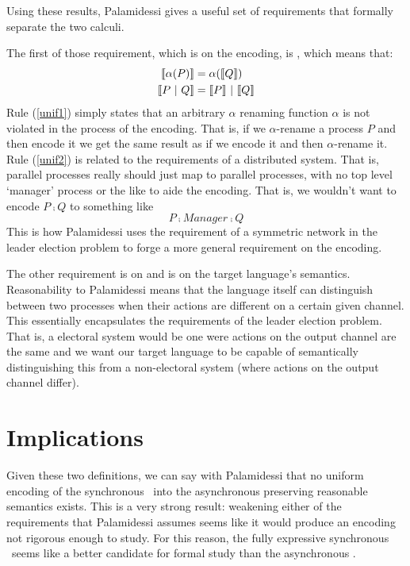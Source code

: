 
Using these results, Palamidessi gives a useful set of requirements that formally separate the two calculi.

The first of those requirement, which is on the encoding, is , which means that:
\begin{align}
	\llbracket{\alpha(P)}\rrbracket &= \alpha(\llbracket{Q}\rrbracket)\label{unif1}\\
	\llbracket{P \ensuremath{\ |\ } Q}\rrbracket &= \llbracket{P}\rrbracket \ |\  \llbracket{Q}\rrbracket\label{unif2}
\end{align}
Rule (\ref{unif1}) simply states that an arbitrary $\alpha$ renaming function $\alpha$  is not violated in the process of the encoding.  That is, if we $\alpha$-rename a process $P$ and then encode it we get the same result as if we encode it and then $\alpha$-rename it.
Rule (\ref{unif2}) is related to the requirements of a distributed system.  
That is, parallel processes really should just map to parallel processes, with no top level `manager' process or the like to aide the encoding.  That is, we wouldn't want to encode $P \comp Q$ to something like 
\[
	P \comp Manager \comp Q
\]
This is how Palamidessi uses the requirement of a symmetric network in the leader election problem to forge a more general requirement on the encoding.

The other requirement is on  and is on the target language's semantics.  
Reasonability to Palamidessi means that the language itself can distinguish between two processes when their actions are different on a certain given channel.  
This essentially encapsulates the requirements of the leader election problem.  
That is, a electoral system would be one were actions on the output channel are the same and we want our target language to be capable of semantically distinguishing this from a non-electoral system (where actions on the output channel differ).

\section{Implications}
Given these two definitions, we can say with Palamidessi that no uniform encoding of the synchronous \picalc\ into the asynchronous \picalc preserving reasonable semantics exists.  This is a very strong result:  weakening either of the requirements that Palamidessi assumes seems like it would produce an encoding not rigorous enough to study.  For this reason, the fully expressive synchronous \picalc\ seems like a better candidate for formal study than the asynchronous \picalc.

